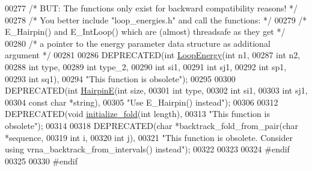 \begin{DoxyCode}
00277 \textcolor{comment}{/* BUT: The functions only exist for backward compatibility reasons!      */}
00278 \textcolor{comment}{/* You better include "loop\_energies.h" and call the functions:           */}
00279 \textcolor{comment}{/* E\_Hairpin() and E\_IntLoop() which are (almost) threadsafe as they get  */}
00280 \textcolor{comment}{/* a pointer to the energy parameter data structure as additional argument */}
00281 
00286 DEPRECATED(\textcolor{keywordtype}{int} \hyperlink{group__mfe__fold__single_ga2163034a25c6115d894b199e97e03f6c}{LoopEnergy}(\textcolor{keywordtype}{int} n1,
00287                           \textcolor{keywordtype}{int} n2,
00288                           \textcolor{keywordtype}{int} type,
00289                           \textcolor{keywordtype}{int} type\_2,
00290                           \textcolor{keywordtype}{int} si1,
00291                           \textcolor{keywordtype}{int} sj1,
00292                           \textcolor{keywordtype}{int} sp1,
00293                           \textcolor{keywordtype}{int} sq1),
00294 \textcolor{stringliteral}{"This function is obsolete"});
00295 
00300 DEPRECATED(\textcolor{keywordtype}{int} \hyperlink{group__mfe__fold__single_gab327ce11972f5ac069d52c8dedfdb700}{HairpinE}(\textcolor{keywordtype}{int} size,
00301                         \textcolor{keywordtype}{int} type,
00302                         \textcolor{keywordtype}{int} si1,
00303                         \textcolor{keywordtype}{int} sj1,
00304                         \textcolor{keyword}{const} \textcolor{keywordtype}{char} *\textcolor{keywordtype}{string}),
00305 \textcolor{stringliteral}{"Use E\_Hairpin() instead"});
00306 
00312 DEPRECATED(\textcolor{keywordtype}{void} \hyperlink{group__mfe__fold__single_gac3f0a28d9cb609d388b155445073fd20}{initialize\_fold}(\textcolor{keywordtype}{int} length),
00313 \textcolor{stringliteral}{"This function is obsolete"});
00314 
00318 DEPRECATED(\textcolor{keywordtype}{char} *backtrack\_fold\_from\_pair(\textcolor{keywordtype}{char} *sequence,
00319                                           \textcolor{keywordtype}{int} i,
00320                                           \textcolor{keywordtype}{int} j),
00321 \textcolor{stringliteral}{"This function is obsolete. Consider using vrna\_backtrack\_from\_intervals() instead"});
00322 
00323 
00324 \textcolor{preprocessor}{#endif}
00325 
00330 \textcolor{preprocessor}{#endif}
\end{DoxyCode}
